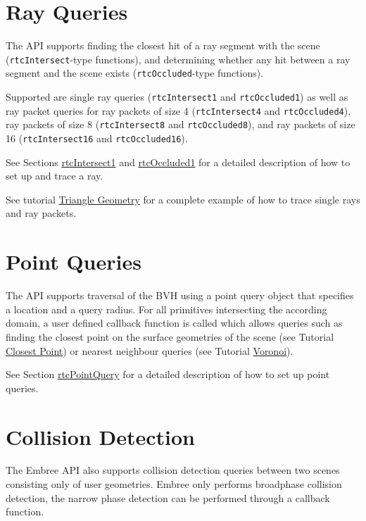 \section{Ray Queries}\label{ray-queries}

The API supports finding the closest hit of a ray segment with the scene
(\texttt{rtcIntersect}-type functions), and determining whether any hit
between a ray segment and the scene exists (\texttt{rtcOccluded}-type
functions).

Supported are single ray queries (\texttt{rtcIntersect1} and
\texttt{rtcOccluded1}) as well as ray packet queries for ray packets of
size 4 (\texttt{rtcIntersect4} and \texttt{rtcOccluded4}), ray packets
of size 8 (\texttt{rtcIntersect8} and \texttt{rtcOccluded8}), and ray
packets of size 16 (\texttt{rtcIntersect16} and \texttt{rtcOccluded16}).

See Sections \hyperref[rtcintersect1]{rtcIntersect1} and
\hyperref[rtcoccluded1]{rtcOccluded1} for a detailed description of how
to set up and trace a ray.

See tutorial \hyperref[triangle-geometry]{Triangle Geometry} for a
complete example of how to trace single rays and ray packets.

\section{Point Queries}\label{point-queries}

The API supports traversal of the BVH using a point query object that
specifies a location and a query radius. For all primitives intersecting
the according domain, a user defined callback function is called which
allows queries such as finding the closest point on the surface
geometries of the scene (see Tutorial \hyperref[closest-point]{Closest
Point}) or nearest neighbour queries (see Tutorial
\hyperref[voronoi]{Voronoi}).

See Section \hyperref[rtcpointquery]{rtcPointQuery} for a detailed
description of how to set up point queries.

\section{Collision Detection}\label{collision-detection}

The Embree API also supports collision detection queries between two
scenes consisting only of user geometries. Embree only performs
broadphase collision detection, the narrow phase detection can be
performed through a callback function.

